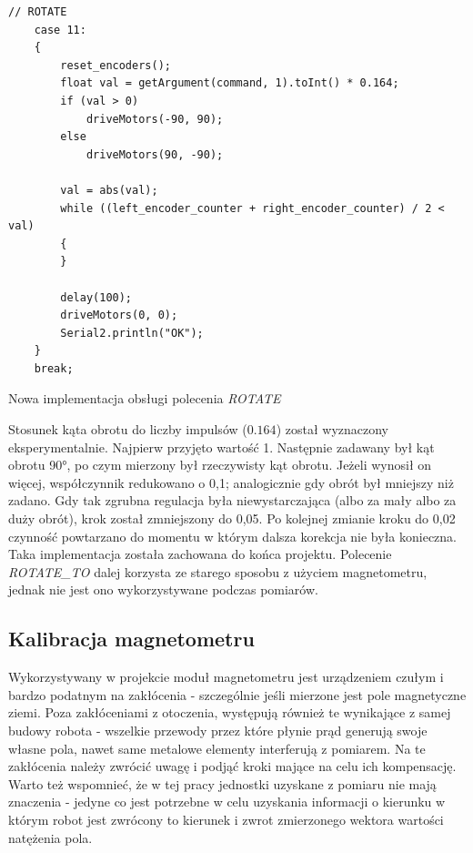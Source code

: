 \begin{listing}[ht]
\begin{verbatim}
// ROTATE
    case 11:
    {
        reset_encoders();
        float val = getArgument(command, 1).toInt() * 0.164;
        if (val > 0)
            driveMotors(-90, 90);
        else
            driveMotors(90, -90);

        val = abs(val);
        while ((left_encoder_counter + right_encoder_counter) / 2 < val)
        {
        }

        delay(100);
        driveMotors(0, 0);
        Serial2.println("OK");
    }
    break;
\end{verbatim}
\caption{Nowa implementacja obsługi polecenia \emph{ROTATE}}
\label{lst:rotate}
\end{listing}

Stosunek kąta obrotu do liczby impulsów ($0.164$) został wyznaczony eksperymentalnie. Najpierw przyjęto wartość 1. Następnie zadawany był kąt obrotu 90°, po czym mierzony był rzeczywisty kąt obrotu. Jeżeli wynosił on więcej, współczynnik redukowano o 0,1; analogicznie gdy obrót był mniejszy niż zadano. Gdy tak zgrubna regulacja była niewystarczająca (albo za mały albo za duży obrót), krok został zmniejszony do 0,05. Po kolejnej zmianie kroku do 0,02 czynność powtarzano do momentu w którym dalsza korekcja nie była konieczna. \\

Taka implementacja została zachowana do końca projektu. Polecenie \emph{ROTATE\_TO} dalej korzysta ze starego sposobu z użyciem magnetometru, jednak nie jest ono wykorzystywane podczas pomiarów.

\subsection{Kalibracja magnetometru}
\label{sec:mag-cal}
Wykorzystywany w projekcie moduł magnetometru jest urządzeniem czułym i bardzo podatnym na zakłócenia - szczególnie jeśli mierzone jest pole magnetyczne ziemi. Poza zakłóceniami z otoczenia, występują również te wynikające z samej budowy robota - wszelkie przewody przez które płynie prąd generują swoje własne pola, nawet same metalowe elementy interferują z pomiarem. Na te zakłócenia należy zwrócić uwagę i podjąć kroki mające na celu ich kompensację. Warto też wspomnieć, że w tej pracy jednostki uzyskane z pomiaru nie mają znaczenia - jedyne co jest potrzebne w celu uzyskania informacji o kierunku w którym robot jest zwrócony to kierunek i zwrot zmierzonego wektora wartości natężenia pola.

